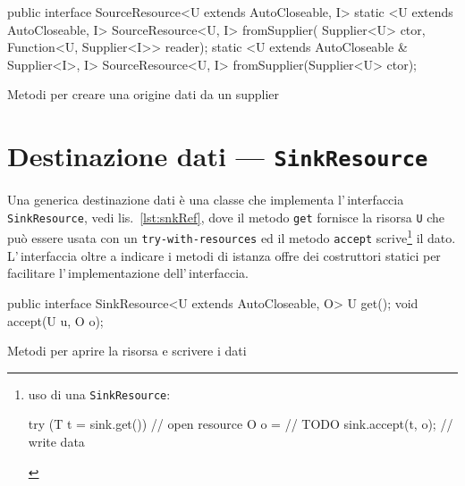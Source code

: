 \begin{elisting}[!htb]
    \begin{javacode}
        public interface SourceResource<U extends AutoCloseable, I> {
    static <U extends AutoCloseable, I> SourceResource<U, I> fromSupplier(
        Supplier<U> ctor, Function<U, Supplier<I>> reader);
    static <U extends AutoCloseable & Supplier<I>, I> SourceResource<U, I> fromSupplier(Supplier<U> ctor);
}
    \end{javacode}
    \caption{Metodi per creare una origine dati da un supplier}
    \label{lst:srcRefSupp}
\end{elisting}


\section{Destinazione dati --- \texttt{SinkResource}} \label{sec:snkRes}
Una generica destinazione dati è una classe che implementa l'\,interfaccia
\texttt{SinkResource}, vedi lis.~\ref{lst:snkRef}, dove il metodo \texttt{get}
fornisce la risorsa \texttt{U} che può essere usata con un
\texttt{try-with-resources} ed il metodo \texttt{accept} scrive\footnote{%
    uso di una \texttt{SinkResource}:
    \begin{javacode}
        try (T t = sink.get()) {    // open resource
        O o = // TODO
        sink.accept(t, o);      // write data
    }
    \end{javacode}
} il dato.
L'\,interfaccia oltre a indicare i metodi di istanza offre dei costruttori
statici per facilitare l'\,implementazione dell'\,interfaccia.

\begin{elisting}[!htb]
    \begin{javacode}
        public interface SinkResource<U extends AutoCloseable, O> {
    U get();
    void accept(U u, O o);
}
    \end{javacode}
    \caption{Metodi per aprire la risorsa e scrivere i dati}
    \label{lst:snkRef}
\end{elisting}

